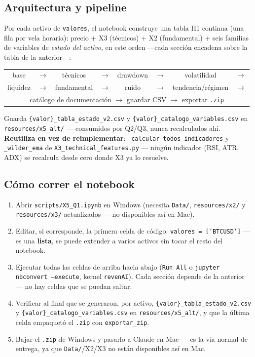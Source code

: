 \documentclass[11pt,a4paper]{article}
\newcommand{\code}[1]{\texttt{\small #1}}
\begin{document}
\subsection{Arquitectura y pipeline}

Por cada activo de \code{valores}, el notebook construye una tabla H1 continua (una fila
por vela horaria): precio + X3 (técnicos) + X2 (fundamental) + seis familias de variables de
\emph{estado del activo}, en este orden —cada sección encadena sobre la tabla de la
anterior—:

\begin{center}
\small
\begin{tabular}{@{}cccccccc@{}}
base & \(\to\) & técnicos & \(\to\) & drawdown & \(\to\) & volatilidad & \(\to\) \\
liquidez & \(\to\) & fundamental & \(\to\) & ruido & \(\to\) & tendencia/régimen & \(\to\) \\
\multicolumn{8}{c}{catálogo de documentación \(\to\) guardar CSV \(\to\) exportar \code{.zip}} \\
\end{tabular}
\end{center}

Guarda \code{\{valor\}\_tabla\_estado\_v2.csv} y \code{\{valor\}\_catalogo\_variables.csv}
en \code{resources/x5\_alt/} — consumidos por Q2/Q3, nunca recalculados ahí.
\textbf{Reutiliza en vez de reimplementar}: \code{\_calcular\_todos\_indicadores} y
\code{\_wilder\_ema} de \code{X3\_technical\_features.py} — ningún indicador (RSI, ATR,
ADX) se recalcula desde cero donde X3 ya lo resuelve.

\subsection{Cómo correr el notebook}

\begin{enumerate}[leftmargin=1.4em,itemsep=2pt]
\item Abrir \code{scripts/X5\_Q1.ipynb} en Windows (necesita \code{Data/},
  \code{resources/x2/} y \code{resources/x3/} actualizados — no disponibles así en Mac).
\item Editar, si corresponde, la primera celda de código: \code{valores = ['BTCUSD']} —
  es una \textbf{lista}, se puede extender a varios activos sin tocar el resto del
  notebook.
\item Ejecutar todas las celdas de arriba hacia abajo (\code{Run All} o
  \code{jupyter nbconvert --execute}, kernel \code{revenAI}). Cada sección depende de la
  anterior — no hay celdas que se puedan saltar.
\item Verificar al final que se generaron, por activo,
  \code{\{valor\}\_tabla\_estado\_v2.csv} y \code{\{valor\}\_catalogo\_variables.csv} en
  \code{resources/x5\_alt/}, y que la última celda empaquetó el \code{.zip} con
  \code{exportar\_zip}.
\item Bajar el \code{.zip} de Windows y pasarlo a Claude en Mac — es la vía normal de
  entrega, ya que \code{Data/}/X2/X3 no están disponibles así en Mac.
\end{enumerate}
\end{document}

